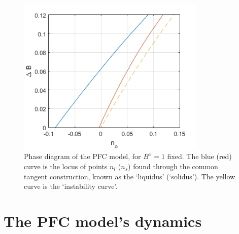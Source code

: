 \begin{figure}[h]
\centering
\includegraphics[width=0.8\textwidth]{fig_pfc/phaseDiagSpin.png}
\caption{Phase diagram of the PFC model, for $B^x=1$ fixed. The blue (red) curve is the locus of points $n_l$ ($n_s$) found through the common tangent construction, known as the `liquidus' (`solidus'). The yellow curve is the `instability curve'.}\label{fig:pfc_phasediag}
\end{figure}

\section{The PFC model's dynamics}\label{sec:pfc_dynamics}

